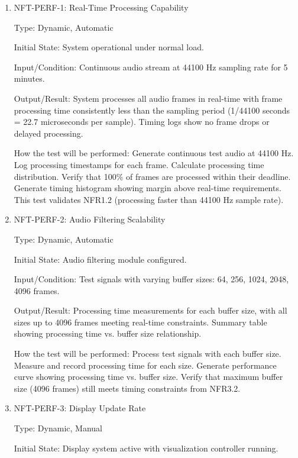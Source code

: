 \documentclass[12pt, titlepage]{article}
\begin{document}
\begin{enumerate}

\item{NFT-PERF-1: Real-Time Processing Capability\\}

Type: Dynamic, Automatic

Initial State: System operational under normal load.

Input/Condition: Continuous audio stream at 44100 Hz sampling rate for 5
minutes.

Output/Result: System processes all audio frames in real-time with frame
processing time consistently less than the sampling period (1/44100 seconds =
22.7 microseconds per sample). Timing logs show no frame drops or delayed
processing.

How the test will be performed: Generate continuous test audio at 44100 Hz. Log
processing timestamps for each frame. Calculate processing time distribution.
Verify that 100\% of frames are processed within their deadline. Generate timing
histogram showing margin above real-time requirements. This test validates
NFR1.2 (processing faster than 44100 Hz sample rate).

\item{NFT-PERF-2: Audio Filtering Scalability\\}

Type: Dynamic, Automatic

Initial State: Audio filtering module configured.

Input/Condition: Test signals with varying buffer sizes: 64, 256, 1024, 2048,
4096 frames.

Output/Result: Processing time measurements for each buffer size, with all sizes
up to 4096 frames meeting real-time constraints. Summary table showing
processing time vs. buffer size relationship.

How the test will be performed: Process test signals with each buffer size. Measure
and record processing time for each size. Generate performance curve showing
processing time vs. buffer size. Verify that maximum buffer size (4096 frames)
still meets timing constraints from NFR3.2.

\item{NFT-PERF-3: Display Update Rate\\}

Type: Dynamic, Manual

Initial State: Display system active with visualization controller running.


\end{enumerate}
\end{document}
